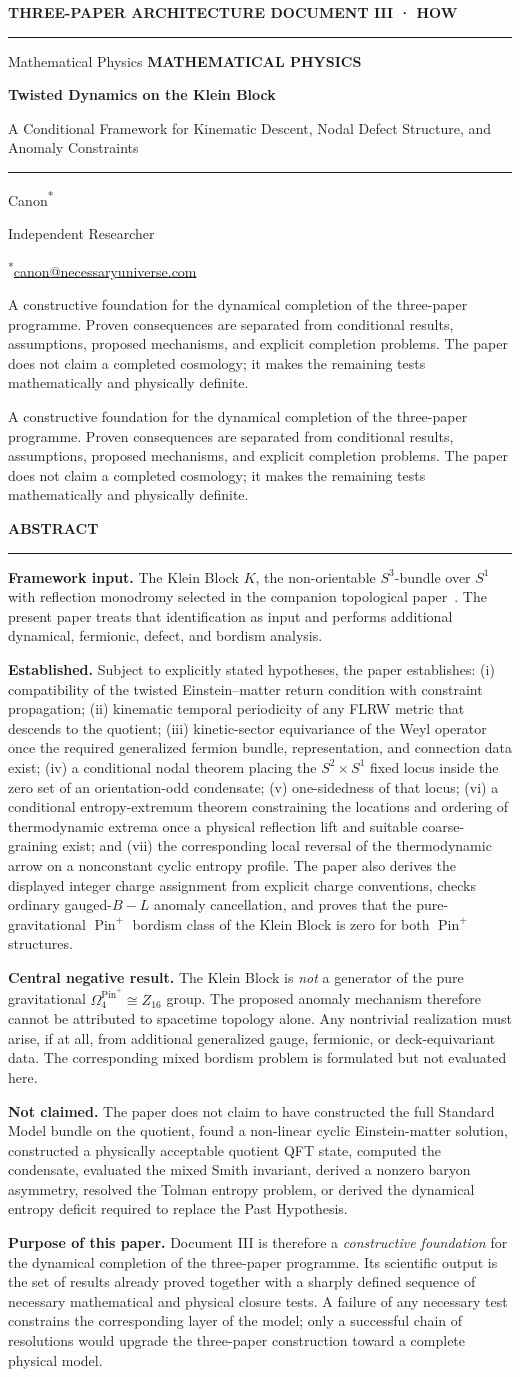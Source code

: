 \documentclass[11pt]{article}
\makeatletter
\theoremstyle{canonmath}
\theoremstyle{canonpostulate}
\theoremstyle{canonclaim}
\providecommand{\Klein}{\mathcal{K}}
\providecommand{\Z}{\mathbb{Z}}
\providecommand{\Sone}{S^1}
\providecommand{\Sthree}{S^3}
\providecommand{\Pin}{\operatorname{Pin}}
\def\mathbb#1{#1}%
\def\mathcal#1{#1}%
\newcommand{\CanonTitlePage}{%
\begin{titlepage}
\thispagestyle{titlepage}
\vspace*{0.62cm}
{\sffamily\footnotesize\bfseries\color{seriesMuted}
THREE-PAPER ARCHITECTURE \hfill \CanonStage\par}
\vspace{0.42cm}
{\color{seriesAccent}\rule{\textwidth}{1.05pt}}\par
\vspace{1.65cm}
\ifx\CanonGenre\empty
\else
{\sffamily\footnotesize\bfseries\color{seriesMuted}\MakeUppercase{\CanonGenre}}\par
\vspace{0.45cm}\fi
{\sffamily\bfseries\fontsize{26}{30}\selectfont\color{seriesInk}\hyphenpenalty=10000\exhyphenpenalty=10000\CanonTitle\par}
\vspace{0.52cm}
{\sffamily\large\color{seriesAccent}\CanonSubtitle\par}
\vspace{0.78cm}
{\color{seriesAccent}\rule{0.24\textwidth}{0.9pt}}\par
\vspace{0.95cm}
{\normalsize\sffamily Canon\textsuperscript{*}\;\orcidlink{0009-0001-9037-6209}\par}
\vspace{0.25cm}
{\small\sffamily\color{seriesMuted}Independent Researcher\par}
\vspace{0.16cm}
{\small\sffamily\color{seriesMuted}\textsuperscript{*}\href{mailto:canon@necessaryuniverse.com}{canon@necessaryuniverse.com}\par}
\vfill
\ifx\CanonDeck\empty
\else
\begin{tcolorbox}[
  enhanced,
  colback=seriesPaper,
  colframe=seriesRule,
  boxrule=0.45pt,
  leftrule=2.4pt,
  arc=1.5pt,
  left=11pt,right=11pt,top=9pt,bottom=9pt,
  width=0.94\textwidth
]
\small\sffamily\color{seriesMuted}
\CanonDeck
\end{tcolorbox}
\vspace{0.65cm}
\fi
\end{titlepage}
}
\newenvironment{CanonAbstract}{%
  \begin{center}
  {\sffamily\footnotesize\bfseries\color{seriesMuted}\MakeUppercase{Abstract}}\\[-0.05em]
  {\color{seriesAccent}\rule{0.16\textwidth}{0.75pt}}
  \end{center}
  \begin{tcolorbox}[
    enhanced,
    breakable,
    colback=white,
    colframe=seriesRule,
    boxrule=0.4pt,
    leftrule=2.2pt,
    arc=1pt,
    left=12pt,right=12pt,top=9pt,bottom=9pt,
    before skip=5pt,after skip=4pt
  ]
  \small
}{%
  \end{tcolorbox}
}
\newcommand{\CanonStage}{DOCUMENT III · HOW}
\newcommand{\CanonGenre}{Mathematical Physics}
\newcommand{\CanonTitle}{Twisted Dynamics on the Klein Block}
\newcommand{\CanonSubtitle}{A Conditional Framework for Kinematic Descent, Nodal Defect Structure, and Anomaly Constraints}
\newcommand{\CanonDeck}{A constructive foundation for the dynamical completion of the three-paper programme. Proven consequences are separated from conditional results, assumptions, proposed mechanisms, and explicit completion problems. The paper does not claim a completed cosmology; it makes the remaining tests mathematically and physically definite.}
\makeatother
\begin{document}
\hypersetup{pageanchor=false}
\CanonTitlePage
\hypersetup{pageanchor=true}

\setcounter{page}{1}

\begin{CanonAbstract}
\textbf{Framework input.} The Klein Block $\Klein$, the non-orientable $\Sthree$-bundle over $\Sone$ with reflection monodromy selected in the companion topological paper~\cite{CanonWhat}. The present paper treats that identification as input and performs additional dynamical, fermionic, defect, and bordism analysis.

\textbf{Established.} Subject to explicitly stated hypotheses, the paper establishes: (i) compatibility of the twisted Einstein--matter return condition with constraint propagation; (ii) kinematic temporal periodicity of any FLRW metric that descends to the quotient; (iii) kinetic-sector equivariance of the Weyl operator once the required generalized fermion bundle, representation, and connection data exist; (iv) a conditional nodal theorem placing the $S^2\times S^1$ fixed locus inside the zero set of an orientation-odd condensate; (v) one-sidedness of that locus; (vi) a conditional entropy-extremum theorem constraining the locations and ordering of thermodynamic extrema once a physical reflection lift and suitable coarse-graining exist; and (vii) the corresponding local reversal of the thermodynamic arrow on a nonconstant cyclic entropy profile. The paper also derives the displayed integer charge assignment from explicit charge conventions, checks ordinary gauged-$B-L$ anomaly cancellation, and proves that the pure-gravitational $\Pin^+$ bordism class of the Klein Block is zero for both $\Pin^+$ structures.

\textbf{Central negative result.} The Klein Block is \emph{not} a generator of the pure gravitational $\Omega_4^{\Pin^+}\cong\Z_{16}$ group. The proposed anomaly mechanism therefore cannot be attributed to spacetime topology alone. Any nontrivial realization must arise, if at all, from additional generalized gauge, fermionic, or deck-equivariant data. The corresponding mixed bordism problem is formulated but not evaluated here.

\textbf{Not claimed.} The paper does not claim to have constructed the full Standard Model bundle on the quotient, found a non-linear cyclic Einstein-matter solution, constructed a physically acceptable quotient QFT state, computed the condensate, evaluated the mixed Smith invariant, derived a nonzero baryon asymmetry, resolved the Tolman entropy problem, or derived the dynamical entropy deficit required to replace the Past Hypothesis.

\textbf{Purpose of this paper.} Document III is therefore a \emph{constructive foundation} for the dynamical completion of the three-paper programme. Its scientific output is the set of results already proved together with a sharply defined sequence of necessary mathematical and physical closure tests. A failure of any necessary test constrains the corresponding layer of the model; only a successful chain of resolutions would upgrade the three-paper construction toward a complete physical model.
\end{CanonAbstract}
\end{document}
